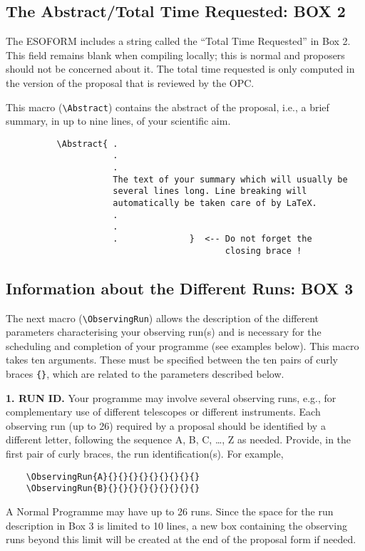 \documentclass{article}
\begin{document}

\subsection{The Abstract/Total Time Requested: {\bf BOX 2}}

The ESOFORM includes a string called the
``Total Time Requested'' in Box 2. 
This field remains blank when compiling locally; this 
is normal and proposers should not be concerned about it.
The total time requested is only computed in the version of the proposal 
that is reviewed by the OPC. 

This macro (\verb|\Abstract|) contains the  abstract of the  proposal,
i.e., a brief summary, in up to nine lines, of your scientific aim.
\begin{verbatim}
          \Abstract{ .
                     .
                     .
                     The text of your summary which will usually be 
                     several lines long. Line breaking will  
                     automatically be taken care of by LaTeX.
                     .
                     .
                     .              }  <-- Do not forget the
                                           closing brace !
\end{verbatim}




\subsection{Information about the Different Runs: {\bf BOX 3}}
\label{sec:obsrun}

The next macro (\verb|\ObservingRun|) allows the description of the
different parameters characterising your observing run(s) and is
necessary for the scheduling and completion of your programme (see
examples below). This macro takes ten arguments.
These must be specified between the ten pairs of curly braces \verb|{}|, 
which are related to the parameters described below.

\medskip

{\bf 1. RUN ID.} Your programme may involve several observing
runs, e.g., for complementary use of different telescopes or
different instruments. Each observing run (up to 26) required by a
proposal should be identified by a different letter, following the
sequence A, B, C, \dots, Z as needed.  Provide, in the first pair of
curly braces, the run identification(s).  For example,
\begin{verbatim}
    \ObservingRun{A}{}{}{}{}{}{}{}{}{}
    \ObservingRun{B}{}{}{}{}{}{}{}{}{}
\end{verbatim}
A Normal Programme may have up to 26 runs. Since the space for the
run description in Box 3 is limited to 10 lines, a new box containing
the observing runs beyond this limit will be created at the end of the
proposal form if needed. 
\end{document}
